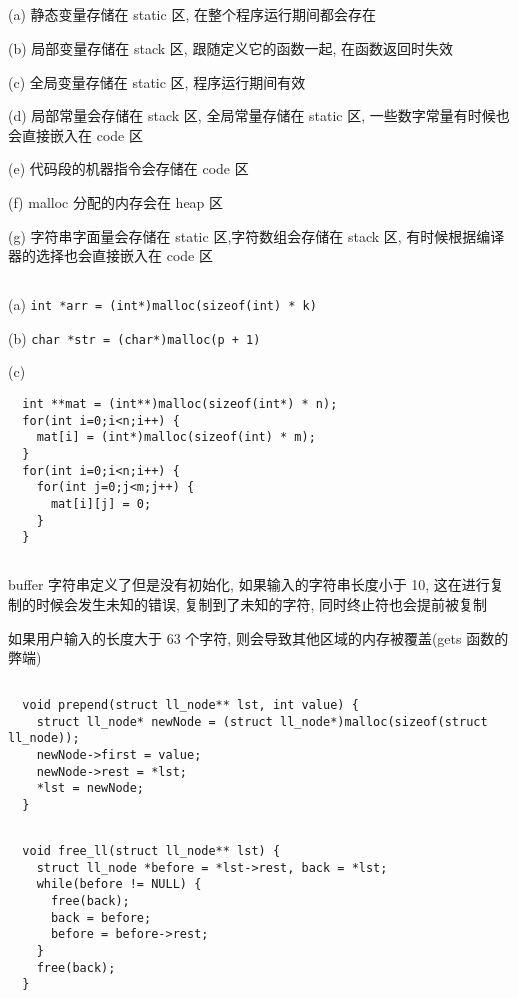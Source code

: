 \documentclass[UTF8,nofonts]{ctexart}
\begin{document}
\subsection{}

(a) 静态变量存储在 static 区, 在整个程序运行期间都会存在

(b) 局部变量存储在 stack 区, 跟随定义它的函数一起, 在函数返回时失效

(c) 全局变量存储在 static 区, 程序运行期间有效

(d) 局部常量会存储在 stack 区, 全局常量存储在 static 区, 一些数字常量有时候也会直接嵌入在 code 区

(e) 代码段的机器指令会存储在 code 区

(f) malloc 分配的内存会在 heap 区

(g) 字符串字面量会存储在 static 区,字符数组会存储在 stack 区, 有时候根据编译器的选择也会直接嵌入在 code 区

\subsection{}

(a) \texttt{int *arr = (int*)malloc(sizeof(int) * k)}

(b) \texttt{char *str = (char*)malloc(p + 1)}

(c)
\begin{verbatim}
  int **mat = (int**)malloc(sizeof(int*) * n);
  for(int i=0;i<n;i++) {
    mat[i] = (int*)malloc(sizeof(int) * m);
  }
  for(int i=0;i<n;i++) {
    for(int j=0;j<m;j++) {
      mat[i][j] = 0;
    }
  }
\end{verbatim}

\subsection{}
buffer 字符串定义了但是没有初始化, 如果输入的字符串长度小于 10, 这在进行复制的时候会发生未知的错误, 复制到了未知的字符, 同时终止符也会提前被复制

如果用户输入的长度大于 63 个字符, 则会导致其他区域的内存被覆盖(gets 函数的弊端)

\subsection{}
\begin{verbatim}
  void prepend(struct ll_node** lst, int value) {
    struct ll_node* newNode = (struct ll_node*)malloc(sizeof(struct ll_node));
    newNode->first = value;
    newNode->rest = *lst;
    *lst = newNode;
  }
\end{verbatim}

\subsection{}
\begin{verbatim}
  void free_ll(struct ll_node** lst) {
    struct ll_node *before = *lst->rest, back = *lst;
    while(before != NULL) {
      free(back);
      back = before;
      before = before->rest;
    }
    free(back);
  }
\end{verbatim}
\end{document}
